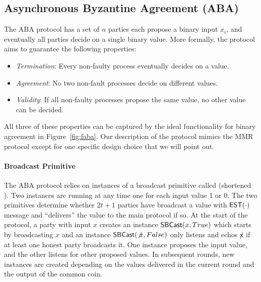 \subsection{Asynchronous Byzantine Agreement (ABA)}
The ABA protocol has a set of $n$ parties each propose a binary input $x_i$, and eventually all parties decide on a single binary value.
More formally, the protocol aims to guarantee the following properties:
\begin{itemize}
\item \emph{Termination}: Every non-faulty process eventually decides on a value.
\item \emph{Agreement}: No two non-fault processes decide on different values.
\item \emph{Validity}: If all non-faulty processes propose the same value, no other value can be decided.
\end{itemize}
All three of these properties can be captured by the ideal functionality for binary agreement in Figure~\ref{fig:faba}.%
Our description of the protocol mimics the MMR protocol except for one specific design choice that we will point out.

\paragraph{Broadcast Primitive}
The ABA protocol relies on instances of a broadcast primitive called  (shortened ).
Two  instances are running at any time one for each input value 1 or 0.
The two primitives determine whether $2t+1$ parties have broadcast a value with ${\mathsf {EST}}(\cdot)$ message and ``delivers'' the value to the main protocol if so.
At the start of the protocol, a party with input $x$ creates an instance ${\mathsf {SBCast}}(x, True)$ which starts by broadcasting $x$ and an instance ${\mathsf {SBCast}}(\not x, False)$ only listens and echos $\not x$ if at least one honest party broadcasts it.
One instance proposes the input value, and the other listens for other proposed values.
In subsequent rounds,  new  instances are created depending on the values delivered in the current round and the output of the common coin.

